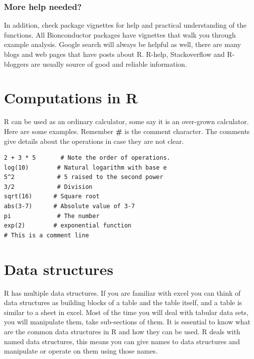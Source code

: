\documentclass[12pt,]{krantz}
\theoremstyle{definition}
\theoremstyle{definition}
\theoremstyle{definition}
\theoremstyle{remark}
\begin{document}
\hypertarget{more-help-needed}{%
\subsubsection{More help needed?}\label{more-help-needed}}

In addition, check package vignettes for help and practical
understanding of the functions. All Bionconductor packages have
vignettes that walk you through example analysis. Google search will
always be helpful as well, there are many blogs and web pages that have
posts about R. R-help, Stackoverflow and R-bloggers are usually source
of good and reliable information.

\hypertarget{computations-in-r}{%
\section{Computations in R}\label{computations-in-r}}

R can be used as an ordinary calculator, some say it is an over-grown
calculator. Here are some examples. Remember \textbf{\#} is the comment
character. The comments give details about the operations in case they
are not clear.

\begin{verbatim}
2 + 3 * 5       # Note the order of operations.
log(10)        # Natural logarithm with base e
5^2            # 5 raised to the second power
3/2            # Division
sqrt(16)      # Square root
abs(3-7)      # Absolute value of 3-7
pi             # The number
exp(2)        # exponential function
# This is a comment line

\end{verbatim}

\hypertarget{data-structures}{%
\section{Data structures}\label{data-structures}}

R has multiple data structures. If you are familiar with excel you can
think of data structures as building blocks of a table and the table
itself, and a table is similar to a sheet in excel. Most of the time you
will deal with tabular data sets, you will manipulate them, take
sub-sections of them. It is essential to know what are the common data
structures in R and how they can be used. R deals with named data
structures, this means you can give names to data structures and
manipulate or operate on them using those names.
\end{document}
